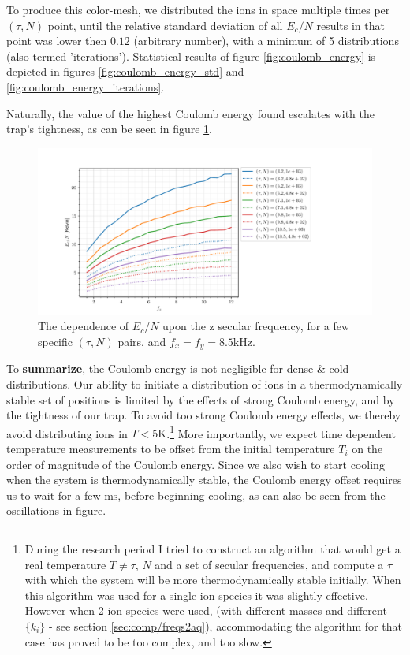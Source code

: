 To produce this color-mesh, we distributed the ions in space multiple times per $(\tau,N)$ point, until the relative standard deviation of all $E_c/N$ results in that point was lower then $0.12$ (arbitrary number), with a minimum of 5 distributions (also termed 'iterations'). Statistical results of figure \ref{fig:coulomb_energy} is depicted in figures \ref{fig:coulomb_energy_std} and \ref{fig:coulomb_energy_iterations}.

Naturally, the value of the highest Coulomb energy found escalates with the trap's tightness, as can be seen in figure \ref{fig:coulomb_energy_f_z}.

\begin{figure}
	\begin{center}
		\includegraphics[width=1.2\textwidth]{graphics/coulomb_energy_f_z.pdf}
	\end{center}
	\caption{The dependence of $E_c/N$ upon the z secular frequency, for a few specific $(\tau,N)$ pairs, and $f_x = f_y = 8.5\mathrm{kHz}$.}\label{fig:coulomb_energy_f_z}
\end{figure}

To \textbf{summarize}, the Coulomb energy is not negligible for dense \& cold distributions. Our ability to initiate a distribution of ions in a thermodynamically stable set of positions is limited by the effects of strong Coulomb energy, and by the tightness of our trap. To avoid too strong Coulomb energy effects, we thereby avoid distributing ions in $T < 5\mathrm{K}$.\footnote{During the research period I tried to construct an algorithm that would get a real temperature $T \ne \tau$, $N$ and a set of secular frequencies, and compute a $\tau$ with which the system will be more thermodynamically stable initially. When this algorithm was used for a single ion species it was slightly effective. However when 2 ion species were used, (with different masses and different $\{k_i\}$ - see section \ref{sec:comp/freqs2aq}), accommodating the algorithm for that case has proved to be too complex, and too slow.} More importantly, we expect time dependent temperature measurements to be offset from the initial temperature $T_i$ on the order of magnitude of the Coulomb energy. Since we also wish to start cooling when the system is thermodynamically stable, the Coulomb energy offset requires us to wait for a few $\mathrm{ms}$, before beginning cooling, as can also be seen from the oscillations in figure. %

